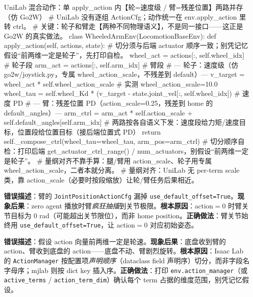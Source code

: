 \begin{codebox}[Python]{UniLab 混合动作：单 apply\_action 内【轮=速度级 / 臂=残差位置】两路并存（仿 Go2W）}
# UniLab 没有逐组 ActionCfg；动作统一在 env.apply_action 里转 ctrl。
# 关键：轮子和臂走【两种不同物理语义】，不是同一接口——这正是 Go2W 的真实做法。
class WheeledArmEnv(LocomotionBaseEnv):
    def apply_action(self, actions, state):
        # 切分须与后端 actuator 顺序一致；别凭记忆假设“前两维一定是轮子”，先打印自检。
        wheel_act = actions[:, self.wheel_idx]         # 轮子段
        arm_act   = actions[:, self.arm_idx]           # 臂段
        # --- 轮子：速度级（仿 go2w/joystick.py，专属 wheel_action_scale，不残差到 default）---
        v_target  = wheel_act * self.wheel_action_scale            # 实测 wheel_action_scale=10.0
        wheel_tau = self.wheel_Kd * (v_target - state.joint_vel[:, self.wheel_idx])  # 速度 PD
        # --- 臂：残差位置 PD（action_scale=0.25，残差到 home 的 default_angles）---
        arm_ctrl  = arm_act * self.action_scale + self.default_angles[self.arm_idx]
        # 两路按各自语义下发：速度段给力矩/速度目标，位置段给位置目标（接后端位置式 PD）
        return self._compose_ctrl(wheel_tau=wheel_tau, arm_pos=arm_ctrl)
# 切分顺序自检：打印后端 get_actuator_ctrl_range() / num_actuators，别假设“前两维一定是轮子”。
# 量纲对齐不靠手算：腿/臂用 action_scale、轮子用专属 wheel_action_scale，二者本就分离。
# 量纲对齐：UniLab 无 per-term scale 类，靠 action_scale（必要时按段缩放）让轮/臂任务后果相近。
\end{codebox}

\begin{pitfall}[忘记给臂设 \texttt{use\_default\_offset=True}]
\textbf{错误描述}：臂的 \verb|JointPositionActionCfg| 漏掉 \verb|use_default_offset=True|。\textbf{现象后果}：zero agent 播放时臂\emph{疯狂抽搐}到关节极限。\textbf{根本原因}：action$=0$ 时臂关节目标为 $0$ rad（可能超出关节限位），而非 home position。\textbf{正确做法}：臂关节始终用 \verb|use_default_offset=True|，让 action$=0$ 对应初始姿态。
\end{pitfall}

\begin{pitfall}
\textbf{错误描述}：假设 action 向量前两维一定是轮速。\textbf{现象后果}：底盘收到臂的 action、臂收到底盘的 action——底盘不动、臂剧烈旋转。\textbf{根本原因}：Isaac Lab 的 \verb|ActionManager| 按配置项\emph{声明顺序}（dataclass field 声明序）切分，而非字段名字母序；mjlab 则按 dict key 插入序。\textbf{正确做法}：打印 \verb|env.action_manager|（或 \verb|active_terms| / \verb|action_term_dim|）确认每个 term 占据的维度范围，别凭记忆假设。
\end{pitfall}

